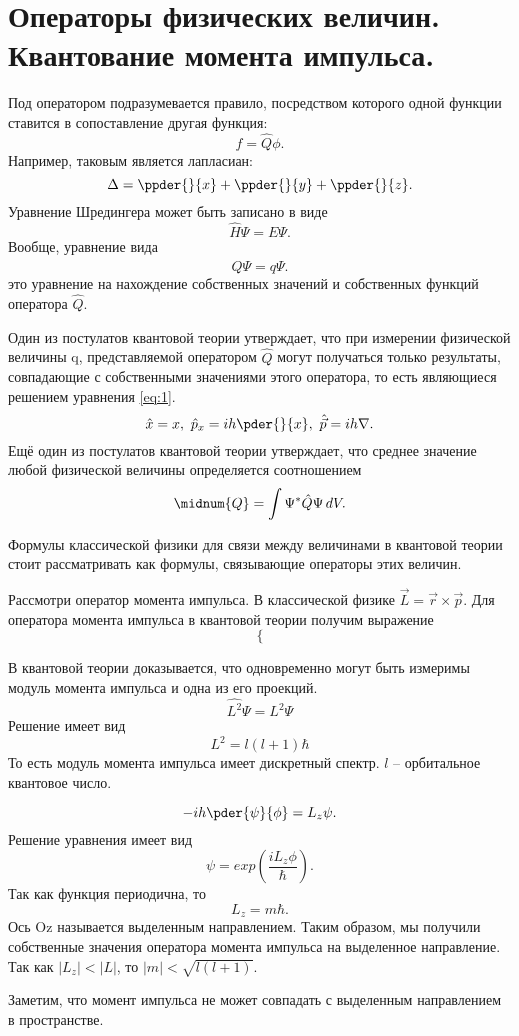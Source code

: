 \chapter{Операторы физических величин. Квантование момента импульса.}

Под оператором подразумевается правило, посредством которого одной функции
ставится в сопоставление другая функция:
\[
    f = \hat{Q}\phi.
\]
Например, таковым является лапласиан:
\[
    \Delta = \ppder{}{x} + \ppder{}{y} + \ppder{}{z}.
\]
Уравнение Шредингера может быть записано в виде
\[
    \hat{H}\Psi = E\Psi.
\]
Вообще, уравнение вида
\begin{equation}
    \hat{Q}\Psi = q\Psi.
    \label{eq:1}    
\end{equation}
это уравнение на нахождение собственных значений и собственных функций оператора
\( \hat{Q} \).

Один из постулатов квантовой теории утверждает, что при измерении физической
величины q, представляемой оператором  \( \hat{Q} \) могут получаться только
результаты, совпадающие с собственными значениями этого оператора, то есть
являющиеся решением уравнения \ref{eq:1}.
\[
    \hat{x} = x,\ \hat{p}_x = ih\pder{}{x},\ \hat{\vec{p}} = ih\nabla. 
\]
Ещё один из постулатов квантовой теории утверждает, что среднее значение любой
физической величины определяется соотношением
\[
    \midnum{Q} = \int \Psi^*\hat{Q}\Psi\,dV.
\]

Формулы классической физики для связи между величинами в квантовой теории стоит
рассматривать как формулы, связывающие операторы этих величин.

Рассмотри оператор момента импульса. В классической физике
\( \vec{L} = \vec{r}\times\vec{p} \). Для оператора момента импульса в квантовой
теории получим выражение
\[
    \left\{\right.
\]

В квантовой теории доказывается, что одновременно могут быть измеримы модуль
момента импульса и одна из его проекций.
\[
    \hat{L^2}\Psi = L^2\Psi
\]
Решение имеет вид
\[
    L^2 = l(l+1)\hbar
\]
То есть модуль момента импульса имеет дискретный спектр. \( l \) -- орбитальное
квантовое число.

\[
    -ih\pder{\psi}{\phi} = L_z\psi.
\]
Решение уравнения имеет вид
\[
    \psi = exp(\frac{iL_z\phi}{\hbar}).
\]
Так как функция периодична, то
\[
    L_z = m\hbar.
\]
Ось Oz  называется выделенным направлением. Таким образом, мы получили
собственные значения оператора момента импульса на выделенное направление.
Так как \( |L_z| < |L| \), то \( |m| < \sqrt{l(l+1)} \).

Заметим, что момент импульса не может совпадать с выделенным направлением в
пространстве.

\newpage
